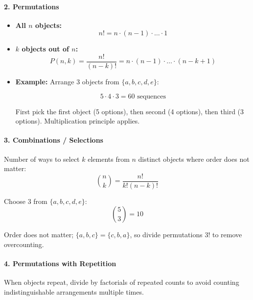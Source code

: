 \paragraph{2. Permutations}
\begin{itemize}
    \item \textbf{All $n$ objects:} 
    \[
    n! = n \cdot (n-1) \cdot \dots \cdot 1
    \]

    \item \textbf{$k$ objects out of $n$:} 
    \[
    P(n,k) = \frac{n!}{(n-k)!} = n \cdot (n-1) \cdot \dots \cdot (n-k+1)
    \]

    \item \textbf{Example:} Arrange 3 objects from $\{a,b,c,d,e\}$:

    \[
    5 \cdot 4 \cdot 3 = 60 \text{ sequences}
    \]

    \begin{explanation}
    First pick the first object (5 options), then second (4 options), then third (3 options). Multiplication principle applies.
    \end{explanation}
\end{itemize}

\paragraph{3. Combinations / Selections}  
\begin{explanation}
Number of ways to select $k$ elements from $n$ distinct objects where order does not matter:
\[
\binom{n}{k} = \frac{n!}{k!(n-k)!}
\]
\end{explanation}

\begin{eg}
Choose 3 from $\{a,b,c,d,e\}$:
\[
\binom{5}{3} = 10
\]

\begin{explanation}
Order does not matter; $\{a,b,c\} = \{c,b,a\}$, so divide permutations $3!$ to remove overcounting.
\end{explanation}
\end{eg}

\paragraph{4. Permutations with Repetition}  
\begin{explanation}
When objects repeat, divide by factorials of repeated counts to avoid counting indistinguishable arrangements multiple times.
\end{explanation}

